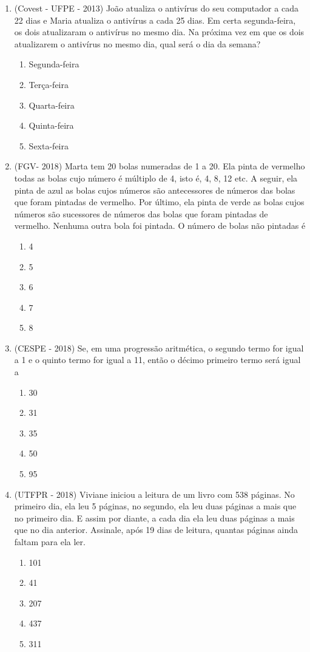 \begin{enumerate}
\item (Covest - UFPE - 2013) João atualiza o antivírus do seu computador a cada 22 dias e Maria atualiza o antivírus a cada 25 dias. Em certa segunda-feira, os dois atualizaram o antivírus no mesmo dia. Na próxima vez em que os dois atualizarem o antivírus no mesmo dia, qual será o dia da semana?
\begin{enumerate}
\item Segunda-feira
\item Terça-feira
\item Quarta-feira
\item Quinta-feira
\item Sexta-feira
\end{enumerate}

\item (FGV- 2018)
Marta tem 20 bolas numeradas de 1 a 20. Ela pinta de vermelho todas as bolas cujo número é múltiplo de 4, isto é, 4, 8, 12 etc.
A seguir, ela pinta de azul as bolas cujos números são antecessores de números das bolas que foram pintadas de vermelho.
Por último, ela pinta de verde as bolas cujos números são sucessores de números das bolas que foram pintadas de vermelho.
Nenhuma outra bola foi pintada.
O número de bolas não pintadas é
\begin{enumerate}
\item 4
\item 5
\item 6
\item 7
\item 8
\end{enumerate}

\item (CESPE - 2018) Se, em uma progressão aritmética, o segundo termo for igual a 1 e o quinto termo for igual a 11, então o décimo primeiro termo será igual a
\begin{enumerate}
\item 30
\item 31
\item 35
\item 50
\item 95
\end{enumerate}

\item (UTFPR - 2018) Viviane iniciou a leitura de um livro com 538 páginas. No primeiro dia, ela leu 5 páginas, no segundo, ela leu duas páginas a mais que no primeiro dia. E assim por diante, a cada dia ela leu duas páginas a mais que no dia anterior. Assinale, após 19 dias de leitura, quantas páginas ainda faltam para ela ler.
\begin{enumerate}
\item 101
\item 41
\item 207
\item 437
\item 311
\end{enumerate}


\end{enumerate}
